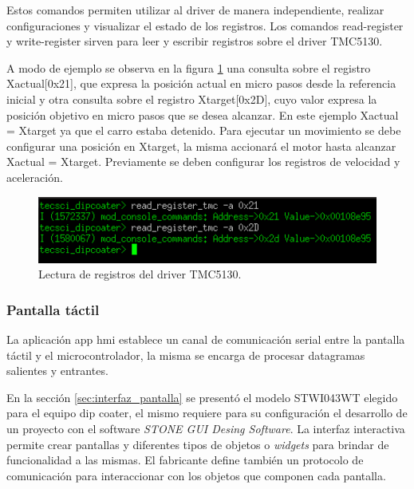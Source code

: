 Estos comandos permiten utilizar al driver de manera independiente, realizar configuraciones y visualizar el estado de los registros.
Los comandos read-register y write-register sirven para leer y escribir registros sobre el driver TMC5130.

A modo de ejemplo se observa en la figura \ref{fig:comando_lectura} una consulta sobre el registro Xactual[0x21], que expresa la posición actual en micro pasos desde la referencia inicial y otra consulta sobre el registro Xtarget[0x2D], cuyo valor expresa la posición objetivo en micro pasos que se desea alcanzar. En este ejemplo Xactual = Xtarget ya que el carro estaba detenido. Para ejecutar un movimiento se debe configurar una posición en Xtarget, la misma accionará el motor hasta alcanzar Xactual = Xtarget. Previamente se deben configurar los registros de velocidad y aceleración.


\begin{figure}[h!]
	\centering
	\includegraphics[width=1\textwidth]{./Figures/consola_6.png}
	\caption{Lectura de registros del driver TMC5130.}
	\label{fig:comando_lectura}
\end{figure}


\subsubsection{Pantalla táctil}

La aplicación app hmi establece un canal de comunicación serial entre la pantalla táctil y el microcontrolador, la misma se encarga de procesar datagramas salientes y entrantes. 

En la sección \ref{sec:interfaz_pantalla} se presentó el modelo STWI043WT elegido para el equipo dip coater, el mismo requiere para su configuración el desarrollo de un proyecto con el software \textit{STONE GUI Desing Software}. La interfaz interactiva permite crear pantallas y diferentes tipos de objetos o \textit{widgets} para brindar de funcionalidad a las mismas. El fabricante define también un protocolo de comunicación \citep{web_protocolo_stone} para interaccionar con los objetos que componen cada pantalla.




